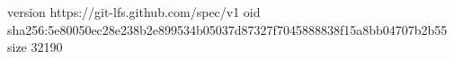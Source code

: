 version https://git-lfs.github.com/spec/v1
oid sha256:5e80050ec28e238b2e899534b05037d87327f7045888838f15a8bb04707b2b55
size 32190
